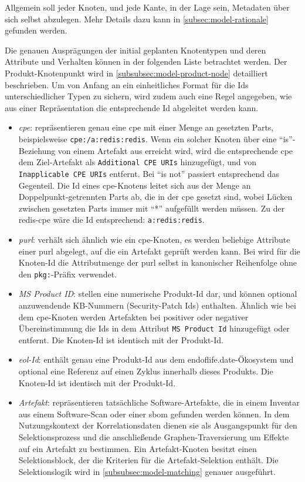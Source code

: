 Allgemein soll jeder Knoten, und jede Kante, in der Lage sein, Metadaten über sich selbst abzulegen.
Mehr Details dazu kann in \autoref{subsec:model-rationale} gefunden werden.

Die genauen Ausprägungen der initial geplanten Knotentypen und deren Attribute und Verhalten können in der folgenden Liste betrachtet werden.
Der Produkt-Knotenpunkt wird in \autoref{subsubsec:model-product-node} detailliert beschrieben.
Um von Anfang an ein einheitliches Format für die Ids unterschiedlicher Typen zu sichern, wird zudem auch eine Regel angegeben, wie aus einer Repräsentation die entsprechende Id abgeleitet werden kann.

\begin{itemize}
    \itemsep0em
    \item \textit{\acrshort{cpe}}: repräsentieren genau eine \acrshort{cpe} mit einer Menge an gesetzten Parts, beispielsweise \texttt{cpe:/a:redis:redis}.
    Wenn ein solcher Knoten über eine \enquote{is}-Beziehung von einem Artefakt aus erreicht wird, wird die entsprechende \acrshort{cpe} dem Ziel-Artefakt als \texttt{Additional CPE URIs} hinzugefügt, und von \texttt{Inapplicable CPE URIs} entfernt.
    Bei \enquote{is not} passiert entsprechend das Gegenteil.
    Die Id eines \acrshort{cpe}-Knotens leitet sich aus der Menge an Doppelpunkt-getrennten Parts ab, die in der \acrshort{cpe} gesetzt sind, wobei Lücken zwischen gesetzten Parts immer mit \enquote{*} aufgefüllt werden müssen.
    Zu der redis-\acrshort{cpe} wäre die Id entsprechend: \texttt{a:redis:redis}.
    \item \textit{\acrshort{purl}}: verhält sich ähnlich wie ein \acrshort{cpe}-Knoten, es werden beliebige Attribute einer \acrshort{purl} abgelegt, auf die ein Artefakt geprüft werden kann.
    Bei  wird für die Knoten-Id die Attributmenge der \acrshort{purl} selbst in kanonischer Reihenfolge ohne den \texttt{pkg:}-Präfix verwendet.
    \item \textit{MS Product ID}: stellen eine numerische Produkt-Id dar, und können optional anzuwendende KB-Nummern (Security-Patch Ids) enthalten.
    Ähnlich wie bei dem \acrshort{cpe}-Knoten werden Artefakten bei positiver oder negativer Übereinstimmung die Ids in dem Attribut \texttt{MS Product Id} hinzugefügt oder entfernt.
    Die Knoten-Id ist identisch mit der Produkt-Id.
    \item \textit{\acrshort{eol}-Id}: enthält genau eine Produkt-Id aus dem endoflife.date-Ökosystem und optional eine Referenz auf einen Zyklus innerhalb dieses Produkts.
    Die Knoten-Id ist identisch mit der Produkt-Id.
    \item \textit{Artefakt}: repräsentieren tatsächliche Software-Artefakte, die in einem Inventar aus einem Software-Scan oder einer \acrshort{sbom} gefunden werden können.
    In dem Nutzungskontext der Korrelationsdaten dienen sie als Ausgangspunkt für den Selektionsprozess und die anschließende Graphen-Traversierung um Effekte auf ein Artefakt zu bestimmen.
    Ein Artefakt-Knoten besitzt einen Selektionsblock, der die Kriterien für die Artefakt-Selektion enthält.
    Die Selektionslogik wird in \autoref{subsubsec:model-matching} genauer ausgeführt.
\end{itemize}

